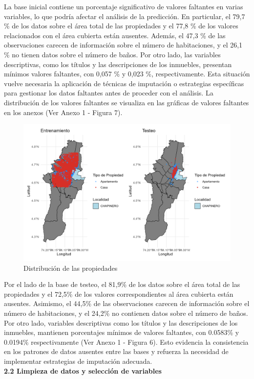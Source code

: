 \documentclass[a4paper]{article}
\theoremstyle{remark}
\theoremstyle{definition}
\begin{document}
La base inicial contiene un porcentaje significativo de valores faltantes en varias variables, lo que podría afectar el análisis de la predicción. En particular, el 79,7 \% de los datos sobre el área total de las propiedades y el 77,8 \% de los valores relacionados con el área cubierta están ausentes. Además, el 47,3 \% de las observaciones carecen de información sobre el número de habitaciones, y el 26,1 \% no tienen datos sobre el número de baños. Por otro lado, las variables descriptivas, como los títulos y las descripciones de los inmuebles, presentan mínimos valores faltantes, con 0,057 \% y 0,023 \%, respectivamente. Esta situación vuelve necesaria la aplicación de técnicas de imputación o estrategias específicas para gestionar los datos faltantes antes de proceder con el análisis. La distribución de los valores faltantes se visualiza en las gráficas de valores faltantes en los anexos (Ver Anexo 1 - Figura 7).


\begin{figure}[H]
    \centering
    \caption{Distribución de las propiedades}
    \includegraphics[width=0.55\linewidth]{Graficas/map_combined.png}
\end{figure}

Por el lado de la base de testeo, el 81,9\% de los datos sobre el área total de las propiedades y el 72,5\% de los valores correspondientes al área cubierta están ausentes. Asimismo, el 44,5\% de las observaciones carecen de información sobre el número de habitaciones, y el 24,2\% no contienen datos sobre el número de baños. Por otro lado, variables descriptivas como los títulos y las descripciones de los inmuebles, mantienen porcentajes mínimos de valores faltantes, con 0.0583\% y 0.0194\% respectivamente (Ver Anexo 1 - Figura 6). Esto evidencia la consistencia en los patrones de datos ausentes entre las bases y refuerza la necesidad de implementar estrategias de imputación adecuada.\\

\textbf{2.2 Limpieza de datos y selección de variables} \\
\end{document}
